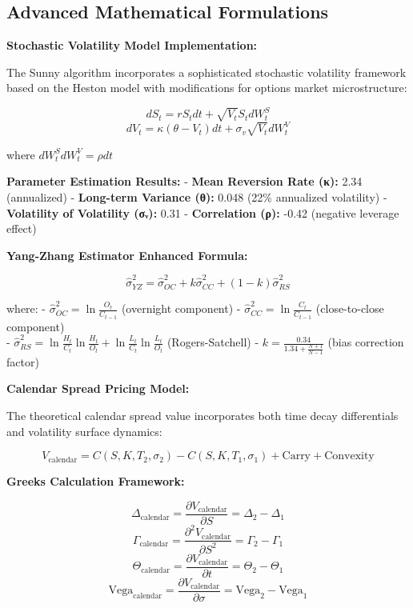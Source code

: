 \documentclass[
  american,
  11pt,
  11pt,
  letterpaper,
  onecolumn]{article}
\begin{document}
\newpage

\subsection{Advanced Mathematical
Formulations}\label{advanced-mathematical-formulations}

\textbf{Stochastic Volatility Model Implementation:}

The Sunny algorithm incorporates a sophisticated stochastic volatility
framework based on the Heston model with modifications for options
market microstructure:

\[dS_t = rS_t dt + \sqrt{V_t}S_t dW_t^S\]
\[dV_t = \kappa(\theta - V_t)dt + \sigma_v\sqrt{V_t}dW_t^V\]

where \(dW_t^S dW_t^V = \rho dt\)

\textbf{Parameter Estimation Results:} - \textbf{Mean Reversion Rate
(κ):} 2.34 (annualized) - \textbf{Long-term Variance (θ):} 0.048 (22\%
annualized volatility) - \textbf{Volatility of Volatility (σᵥ):} 0.31 -
\textbf{Correlation (ρ):} -0.42 (negative leverage effect)

\textbf{Yang-Zhang Estimator Enhanced Formula:}

\[\hat{\sigma}_{YZ}^2 = \hat{\sigma}_{OC}^2 + k\hat{\sigma}_{CC}^2 + (1-k)\hat{\sigma}_{RS}^2\]

where: - \(\hat{\sigma}_{OC}^2 = \ln\frac{O_t}{C_{t-1}}\) (overnight
component) - \(\hat{\sigma}_{CC}^2 = \ln\frac{C_t}{C_{t-1}}\)
(close-to-close component)\\
-
\(\hat{\sigma}_{RS}^2 = \ln\frac{H_t}{C_t}\ln\frac{H_t}{O_t} + \ln\frac{L_t}{C_t}\ln\frac{L_t}{O_t}\)
(Rogers-Satchell) - \(k = \frac{0.34}{1.34 + \frac{N+1}{N-1}}\) (bias
correction factor)

\textbf{Calendar Spread Pricing Model:}

The theoretical calendar spread value incorporates both time decay
differentials and volatility surface dynamics:

\[V_{\text{calendar}} = C(S,K,T_2,\sigma_2) - C(S,K,T_1,\sigma_1) + \text{Carry} + \text{Convexity}\]

\textbf{Greeks Calculation Framework:}

\[\Delta_{\text{calendar}} = \frac{\partial V_{\text{calendar}}}{\partial S} = \Delta_2 - \Delta_1\]
\[\Gamma_{\text{calendar}} = \frac{\partial^2 V_{\text{calendar}}}{\partial S^2} = \Gamma_2 - \Gamma_1\]
\[\Theta_{\text{calendar}} = \frac{\partial V_{\text{calendar}}}{\partial t} = \Theta_2 - \Theta_1\]
\[\text{Vega}_{\text{calendar}} = \frac{\partial V_{\text{calendar}}}{\partial \sigma} = \text{Vega}_2 - \text{Vega}_1\]
\end{document}
